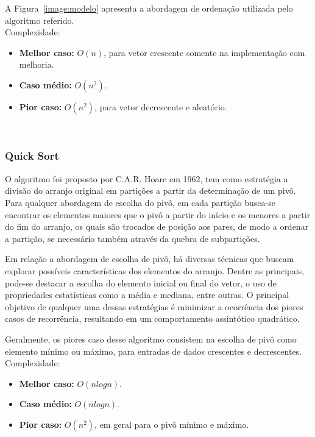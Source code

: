 \documentclass[conference]{IEEEtran}
\begin{document}
A Figura~\ref{image:modelo} apresenta a abordagem de ordenação utilizada pelo algoritmo referido.\\

Complexidade:
\begin{itemize}
\item \textbf{Melhor caso:} $O (n)$, para vetor crescente somente na implementação com melhoria.
\item \textbf{Caso médio:} $O (n^2)$.
\item \textbf{Pior caso:} $O (n^2)$, para vetor decrescente e aleatório.
\end{itemize}

~\\
\subsubsection{Quick Sort}
O algoritmo foi proposto por C.A.R. Hoare em 1962, tem como estratégia a divisão do arranjo original em partições a partir da determinação de um pivô. Para qualquer abordagem de escolha do pivô, em cada partição busca-se encontrar os elementos maiores que o pivô a partir do início e os menores a partir do fim do arranjo, os quais são trocados de posição aos pares, de modo a ordenar a partição, se necessário também através da quebra de subpartições.

Em relação a abordagem de escolha de pivô, há diversas técnicas que buscam explorar possíveis características dos elementos do arranjo. Dentre as principais, pode-se destacar a escolha do elemento inicial ou final do vetor, o uso de propriedades estatísticas como a média e mediana, entre outras. O principal objetivo de qualquer uma dessas estratégias é minimizar a ocorrência dos piores casos de recorrência, resultando em um comportamento assintótico quadrático.

Geralmente, os piores caso desse algoritmo consistem na escolha de pivô como elemento mínimo ou máximo, para entradas de dados crescentes e decrescentes.\\

Complexidade:
\begin{itemize}
\item \textbf{Melhor caso:} $O (nlog n)$.
\item \textbf{Caso médio:} $O (nlog n)$.
\item \textbf{Pior caso:} $O (n^2)$, em geral para o pivô mínimo e máximo.
\end{itemize}


~\\
\end{document}
